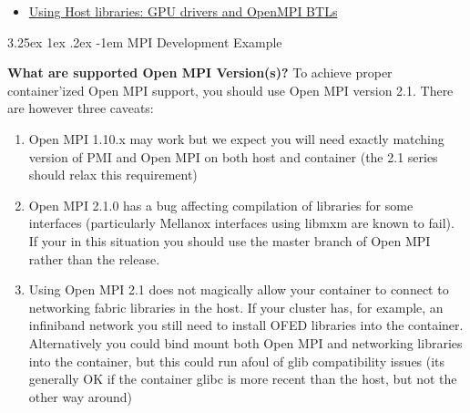 \documentclass[a4paper]{article}
\makeatletter
\renewcommand\paragraph{\@startsection{paragraph}{5}{\z@}%
  {3.25ex \@plus1ex \@minus.2ex}%
  {-1em}%
  {\normalfont\normalsize\bfseries}}
\makeatother
\begin{document}
\begin{itemize}
\item \href{http://singularity.lbl.gov/tutorial-gpu-drivers-open-mpi-mtls}{Using Host libraries: GPU drivers and OpenMPI BTLs
}
\end{itemize}

\paragraph{MPI Development Example}

\textbf{What are supported Open MPI Version(s)?} To achieve proper container’ized Open MPI support, you should use Open MPI version 2.1. There are however three caveats:

\begin{enumerate}
\item Open MPI 1.10.x may work but we expect you will need exactly matching version of PMI and Open MPI on both host and container (the 2.1 series should relax this requirement)
\item Open MPI 2.1.0 has a bug affecting compilation of libraries for some interfaces (particularly Mellanox interfaces using libmxm are known to fail). If your in this situation you should use the master branch of Open MPI rather than the release.
\item Using Open MPI 2.1 does not magically allow your container to connect to networking fabric libraries in the host. If your cluster has, for example, an infiniband network you still need to install OFED libraries into the container. Alternatively you could bind mount both Open MPI and networking libraries into the container, but this could run afoul of glib compatibility issues (its generally OK if the container glibc is more recent than the host, but not the other way around)

\end{enumerate}
\end{document}
